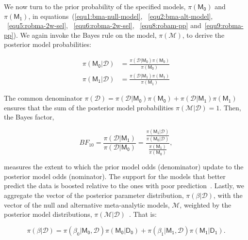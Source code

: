 \documentclass[12pt, english]{article}
\begin{document}
    We now turn to the prior probability of the specified models, $\pi(\mathsf{M_0})$ and $\pi(\mathsf{M_1})$, in equations~(\ref{equ1:bma-null-model}, ~\ref{equ2:bma-alt-model}, ~\ref{equ5:robma-2w-sel}, ~\ref{equ6:robma-2w-sel}, ~\ref{equ8:robam-pp} and~\ref{equ9:robma-pp}). We again invoke the Bayes rule on the model, $\pi(\mathcal{M})$, to derive the posterior model probabilities:

    \begin{align}
        \pi(\mathsf{M_0} | \mathcal{D}) &= \frac{\pi(\mathcal{D} | \mathsf{M_0})\pi(\mathsf{M_0})}{\pi(\mathsf{M_0})} \label{equ13} \\
        \pi(\mathsf{M_1} | \mathcal{D}) &= \frac{\pi(\mathcal{D} | \mathsf{M_1})\pi(\mathsf{M_1})}{\pi(\mathsf{M_1})} \label{equ14}
    \end{align}

    The common denominator $\pi(\mathcal{D}) = \pi(\mathcal{D} | \mathsf{M_0})\pi(\mathsf{M_0}) + \pi(\mathcal{D} | \mathsf{M_1})\pi(\mathsf{M_1})$ ensures that the sum of the posterior model probabilities $\pi(\mathcal{M} | \mathcal{D}) = 1$. Then, the Bayes factor,

    \begin{equation}
        \label{equ15:Bayes-Factor}
        BF_{10} = \frac{\pi(\mathcal{D} | \mathsf{M_1})}{\pi(\mathcal{D} | \mathsf{M_0})} = \dfrac{\frac{\pi(\mathsf{M_1} | \mathcal{D})}{\pi(\mathsf{M_0} | \mathcal{D})}}{\frac{\pi(\mathsf{M_1})}{\pi(\mathsf{M_0})}},
    \end{equation}

    measures the extent to which the prior model odds (denominator) update to the posterior model odds (nominator). The support for the models that better predict the data is boosted relative to the ones with poor prediction~\parencites{roudermorey2019, wagenmakers2016}. Lastly, we aggregate the vector of the posterior parameter distribution, $\pi(\beta | \mathcal{D})$, with the vector of the null and alternative meta-analytic models, $\mathcal{M}$, weighted by the posterior model distributions, $\pi(\mathcal{M}|\mathcal{D})$~\parencites{jeffreys1935, wrinchjeffreys1921}. That is:

    \begin{equation}
        \label{equ16}
        \pi(\beta | \mathcal{D}) = \pi(\beta_0 | \mathsf{M_0}, \mathcal{D}) \pi(\mathsf{M_0} | \mathsf{D_0}) + \pi(\beta_1 | \mathsf{M_1}, \mathcal{D}) \pi(\mathsf{M_1} | \mathsf{D_1}).
    \end{equation}
\end{document}
